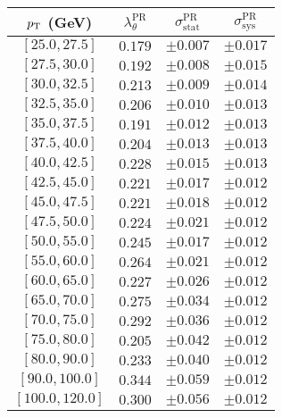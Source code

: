 \begin{tabular}{c||c||c|c}
$p_\text{T}$ (GeV) & $\lambda_\theta^{\text{PR}}$ & $\sigma_{\text{stat}}^{\text{PR}}$ & $\sigma_{\text{sys}}^{\text{PR}}$  \\
\hline
$[25.0, 27.5]$& $0.179$ & $\pm0.007$ & $\pm0.017$\\
$[27.5, 30.0]$& $0.192$ & $\pm0.008$ & $\pm0.015$\\
$[30.0, 32.5]$& $0.213$ & $\pm0.009$ & $\pm0.014$\\
$[32.5, 35.0]$& $0.206$ & $\pm0.010$ & $\pm0.013$\\
$[35.0, 37.5]$& $0.191$ & $\pm0.012$ & $\pm0.013$\\
$[37.5, 40.0]$& $0.204$ & $\pm0.013$ & $\pm0.013$\\
$[40.0, 42.5]$& $0.228$ & $\pm0.015$ & $\pm0.013$\\
$[42.5, 45.0]$& $0.221$ & $\pm0.017$ & $\pm0.012$\\
$[45.0, 47.5]$& $0.221$ & $\pm0.018$ & $\pm0.012$\\
$[47.5, 50.0]$& $0.224$ & $\pm0.021$ & $\pm0.012$\\
$[50.0, 55.0]$& $0.245$ & $\pm0.017$ & $\pm0.012$\\
$[55.0, 60.0]$& $0.264$ & $\pm0.021$ & $\pm0.012$\\
$[60.0, 65.0]$& $0.227$ & $\pm0.026$ & $\pm0.012$\\
$[65.0, 70.0]$& $0.275$ & $\pm0.034$ & $\pm0.012$\\
$[70.0, 75.0]$& $0.292$ & $\pm0.036$ & $\pm0.012$\\
$[75.0, 80.0]$& $0.205$ & $\pm0.042$ & $\pm0.012$\\
$[80.0, 90.0]$& $0.233$ & $\pm0.040$ & $\pm0.012$\\
$[90.0, 100.0]$& $0.344$ & $\pm0.059$ & $\pm0.012$\\
$[100.0, 120.0]$& $0.300$ & $\pm0.056$ & $\pm0.012$\\
\end{tabular}
